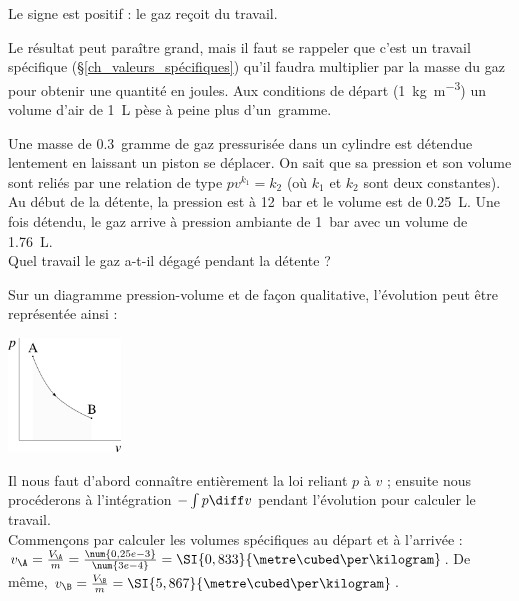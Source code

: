 \begin{anexample}
\begin{answer}
							\begin{remark}Le signe est positif : le gaz reçoit du travail.\end{remark}
							\begin{remark}Le résultat peut paraître grand, mais il faut se rappeler que c’est un travail spécifique (\S\ref{ch_valeurs_spécifiques}) qu’il faudra multiplier par la masse du gaz pour obtenir une quantité en joules. Aux conditions de départ (\SI{1}{\kilogram\per\metre\cubed}) un volume d’air de \SI{1}{\liter} pèse à peine plus d’un~\si{gramme}. \end{remark}
					\end{answer}
			\end{anexample}

			\begin{anexample}
				Une masse de \SI{0,3}{gramme} de gaz pressurisée dans un cylindre est détendue lentement en laissant un piston se déplacer. On sait que sa pression et son volume sont reliés par une relation de type $p v^{k_1} = k_2$ (où $k_1$ et $k_2$ sont deux constantes).\\
				Au début de la détente, la pression est à \SI{12}{\bar} et le volume est de \SI{0,25}{\liter}. Une fois détendu, le gaz arrive à pression ambiante de \SI{1}{\bar} avec un volume de \SI{1,76}{\liter}.\\
				Quel travail le gaz a-t-il dégagé pendant la détente ?				
					\begin{answer}
						Sur un diagramme pression-volume et de façon qualitative, l’évolution peut être représentée ainsi :
							\begin{center}
								\includegraphics[width=3cm]{images/ex_pv_exp2.png}
							\end{center}
						Il nous faut d’abord connaître entièrement la loi reliant $p$ à $v$ ; ensuite nous procéderons à l’intégration $-\int p \diff v$ pendant l’évolution pour calculer le travail.\\
						Commençons par calculer les volumes spécifiques au départ et à l’arrivée : $v_\A = \frac{V_\A}{m} = \frac{\num{0,25e-3}}{\num{3e-4}} = \SI{0,833}{\metre\cubed\per\kilogram}$. De même, $v_\B = \frac{V_\B }{m} = \SI{5,867}{\metre\cubed\per\kilogram}$.

\end{answer}
\end{anexample}
